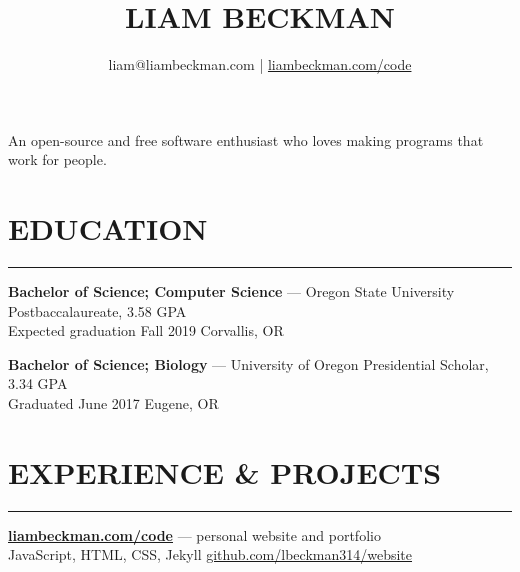 


\title{\textcolor{my-red}{LIAM BECKMAN}}
\author{liam@liambeckman.com | \href{https://liambeckman.com/code}{liambeckman.com/code}}

\date{\vspace{-5ex}}



\maketitle

\begin{center}
An open-source and free software enthusiast who loves making programs that work for people.
\end{center}

\newcommand{\myTitle}[1] {
    \vspace{-1em}
    \section*{\large{#1}}\vspace{-1.7em}
    \textcolor{my-grey}{\rule{\linewidth}{0.5pt}}
    \vspace{-1em}
}

\newcommand{\showoff}[4] {
    \textcolor{my-blue}{\textbf{#1}} --- #2\\
    \textcolor{my-grey}{#3 \hfill #4}
    \medskip
}

\newcommand{\myBreak} {
    \textcolor{my-grey}{\dotfill}
    \smallskip
}

\myTitle{EDUCATION}

\showoff{Bachelor of Science; Computer Science}{Oregon State University Postbaccalaureate, 3.58 GPA}{Expected graduation Fall 2019}{Corvallis, OR}

\myBreak

\showoff{Bachelor of Science; Biology}{University of Oregon Presidential Scholar, 3.34 GPA}{Graduated June 2017}{Eugene, OR}

\medbreak

\myTitle{EXPERIENCE \& PROJECTS}

\showoff{\href{https://liambeckman.com}{liambeckman.com/code}}{personal website and portfolio}{JavaScript, HTML, CSS, Jekyll}{\href{https://github.com/lbeckman314/website}{github.com/lbeckman314/website}}

